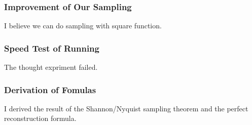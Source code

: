\documentclass{article}
\begin{document}
    \subsubsection*{Improvement of Our Sampling}
    I believe we can do sampling with square function.
    \subsubsection*{Speed Test of Running}
    The thought expriment failed.
    \subsubsection*{Derivation of Fomulas}
    I derived the result of the Shannon/Nyquist sampling theorem and the perfect reconstruction formula.

% 
% 


\end{document}
